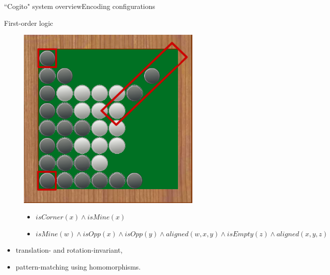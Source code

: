 \begin{frame}{``Cogito" system overview}{Encoding configurations}

\begin{block}{First-order logic}

\begin{figure}[ht]
  \begin{minipage}[t]{0.4\linewidth}
    \vspace{0pt}
    \centering
    \includegraphics[width=0.8\textwidth]{img/cogito/raisonneur_choix_2}	
  \end{minipage}
  \hfill
  \begin{minipage}[t]{0.55\textwidth}
    \vspace{0pt}
    \begin{itemize}
	\item $isCorner(x) \wedge isMine(x)$
	\item $isMine(w) \wedge isOpp(x) \wedge isOpp(y) 
		  \wedge aligned(w,x,y) \wedge isEmpty(z) 
		  \wedge aligned (x,y,z)$
    \end{itemize}
  \end{minipage}
\end{figure}


  \begin{itemize}
    \item translation- and rotation-invariant,
    \item pattern-matching using homomorphisms.
  \end{itemize}
\end{block}



\end{frame}

